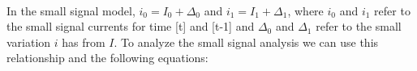 \documentclass[10pt]{article}
\begin{document}
\paragraph{}
In the small signal model, \(i_0=I_0+\Delta_0\) and \(i_1=I_1+\Delta_1\), where \(i_0\) and \(i_1\) refer to the small signal currents for time [t] and [t-1] and \(\Delta_0\) and \(\Delta_1\) refer to the small variation \(i\) has from \(I\). To analyze the small signal analysis we can use this relationship and the following equations:


\onecolumn

%
%
\end{document}
